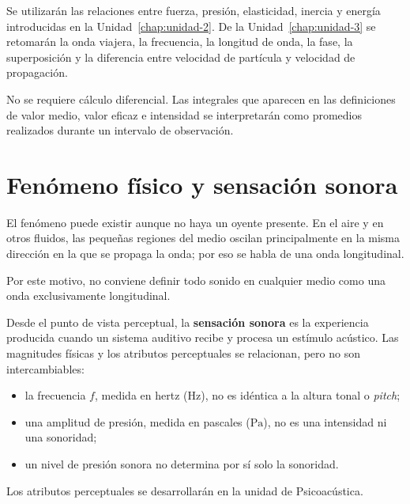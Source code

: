 Se utilizarán las relaciones entre fuerza, presión, elasticidad, inercia y
energía introducidas en la Unidad~\ref{chap:unidad-2}. De la
Unidad~\ref{chap:unidad-3} se retomarán la onda viajera, la frecuencia, la
longitud de onda, la fase, la superposición y la diferencia entre velocidad de
partícula y velocidad de propagación.

No se requiere cálculo diferencial. Las integrales que aparecen en las
definiciones de valor medio, valor eficaz e intensidad se interpretarán como
promedios realizados durante un intervalo de observación.

\section{Fenómeno físico y sensación sonora}
\label{sec:u4-fenomeno-percepcion}

 El fenómeno puede existir aunque no haya un
oyente presente. En el aire y en otros fluidos, las pequeñas regiones del
medio oscilan principalmente en la misma dirección en la que se propaga la
onda; por eso se habla de una onda longitudinal.

 Por este motivo, no conviene
definir todo sonido en cualquier medio como una onda exclusivamente
longitudinal.

Desde el punto de vista perceptual, la \textbf{sensación sonora} es la
experiencia producida cuando un sistema auditivo recibe y procesa un estímulo
acústico. Las magnitudes físicas y los atributos perceptuales se relacionan,
pero no son intercambiables:

\begin{itemize}
    \item la frecuencia \(f\), medida en hertz (\(\text{Hz}\)), no es idéntica
    a la altura tonal o \emph{pitch};
    \item una amplitud de presión, medida en pascales (\(\text{Pa}\)), no es
    una intensidad ni una sonoridad;
    \item un nivel de presión sonora no determina por sí solo la sonoridad.
\end{itemize}

 Los
atributos perceptuales se desarrollarán en la unidad de Psicoacústica.

